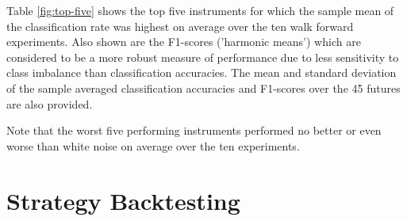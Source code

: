 \documentclass{article}
\begin{document}
\vspace{10pt}
Table \ref{fig:top-five} shows the top five instruments for which the sample mean of the classification rate was highest on average over the ten walk forward experiments. Also shown are the F1-scores ('harmonic means') which are considered to be a more robust measure of performance due to less sensitivity to class imbalance than classification accuracies. The mean and standard deviation of the sample averaged classification accuracies and F1-scores over the 45 futures are also provided.


\vspace{10pt}
\begin{table}[h]
\centerline{
}
\caption{This table shows the top five instruments for which the sample mean of the classification rate was highest over the ten walk forward experiments. F1-scores are also provided. The mean and standard deviation of the sample mean classification accuracies and F1-scores over the 45 futures are also provided.}
\label{fig:top-five}
\end{table}

\vspace{10pt}
Note that the worst five performing instruments performed no better or even worse than white noise on average over the ten experiments.






\section{Strategy Backtesting} \label{sect:backtesting}
\end{document}
